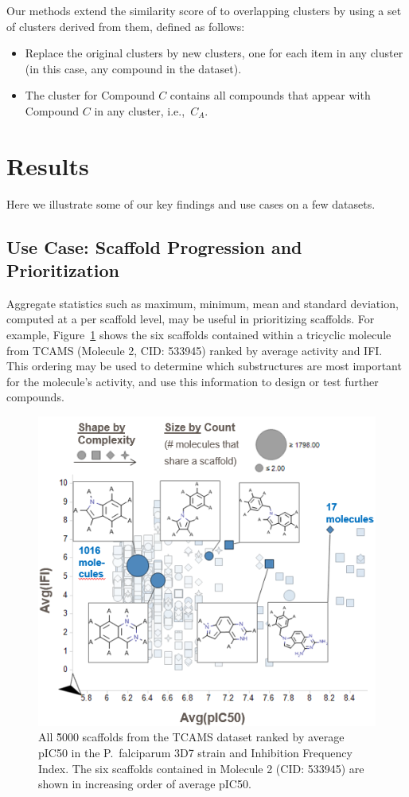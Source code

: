 \documentclass[journal=jacsat,manuscript=article]{achemso}
\newcommand*\fref[1]{Figure~\ref{fig:#1}}
\newcommand*\ie{i.e.,~}
\begin{document}
Our methods extend the similarity score of \citeauthor{Torres2009} to
overlapping clusters by using a set of clusters derived from them,
defined as follows:
\begin{itemize}
\item Replace the original clusters by new clusters, one for each item
  in any cluster (in this case, any compound in the dataset).
\item The cluster for Compound $C$ contains all compounds that appear
  with Compound $C$ in any cluster, \ie $C_A$.
\end{itemize}


\section{Results}
\label{sec:results}
Here we illustrate some of our key findings and use cases on a few datasets. 

\subsection{Use Case: Scaffold Progression and Prioritization}
Aggregate statistics such as maximum, minimum, mean and standard deviation, computed at a per scaffold level, may be useful in prioritizing scaffolds. For example, \fref{RGTaggr} shows the six scaffolds contained within a tricyclic molecule from TCAMS (Molecule 2, CID: 533945) ranked by average activity and IFI. This ordering may be used to determine which substructures are most important for the molecule's activity, and use this information to design or test further compounds.

\begin{figure}
  \includegraphics[width=5in]{fig/RGT_aggr_prop2.png}
  \caption{All \~5000 scaffolds from the TCAMS dataset ranked by average pIC50 in the P.~falciparum 3D7 strain and Inhibition Frequency Index. The six scaffolds contained in Molecule 2 (CID: 533945) are shown in increasing order of average pIC50.}
\label{fig:RGTaggr}   
\end{figure}
\end{document}
